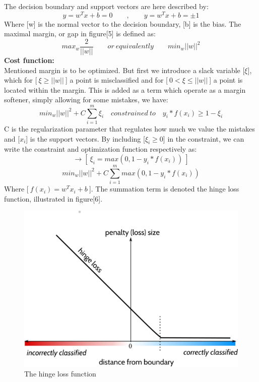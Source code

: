 The decision boundary and support vectors are here described by:
\begin{equation}
	y = w^Tx+b=0 \qquad , \qquad y = w^Tx+b=\pm1
\end{equation}
Where [w] is the normal vector to the decision boundary, [b] is the bias. The maximal margin, or gap in figure[5] is defined as:
\begin{equation}
	max_w \frac{2}{||w||} \qquad or \  equivalently \qquad min_w||w||^2
\end{equation}
\textbf{Cost function:}\\
Mentioned margin is to be optimized. But first we introduce a slack variable [$\xi$], which for [$\ \xi \geq ||w||\ $]  a point is misclassified and for [$\  0 < \xi \leq ||w||\ $] a point is located within the margin. This is added as a term which operate as a margin softener, simply allowing for some mistakes, we have:
\begin{equation}
	min_w||w||^2 + C\sum_{i=1}^{m} \xi_i \quad constrained \ to \quad y_i*f(x_i) \geq 1 - \xi_i
\end{equation}
C is the regularization parameter that regulates how much we value the mistakes and [$x_i$] is the support vectors. By including [$\xi_i \geq 0$] in the constraint, we can write the constraint and optimization function respectively as:
\begin{equation}
	[\ y_i*f(x_i) \geq 1 - \xi_i\ ] \rightarrow [\ \xi_i = max(0,1-y_i*f(x_i))\ ]
\end{equation}
\begin{equation}
	min_w||w||^2 + C\sum_{i=1}^{m} max(0,1-y_i*f(x_i))
\end{equation}
Where [$\ f(x_i)=w^Tx_i+b\ $]. The summation term is denoted the hinge loss function, illustrated in figure[6]. 
\begin{figure}[H]
\centering
\includegraphics[scale=1.2]{pictures/hinge.png} 
\caption{The hinge loss function}
\end{figure}
